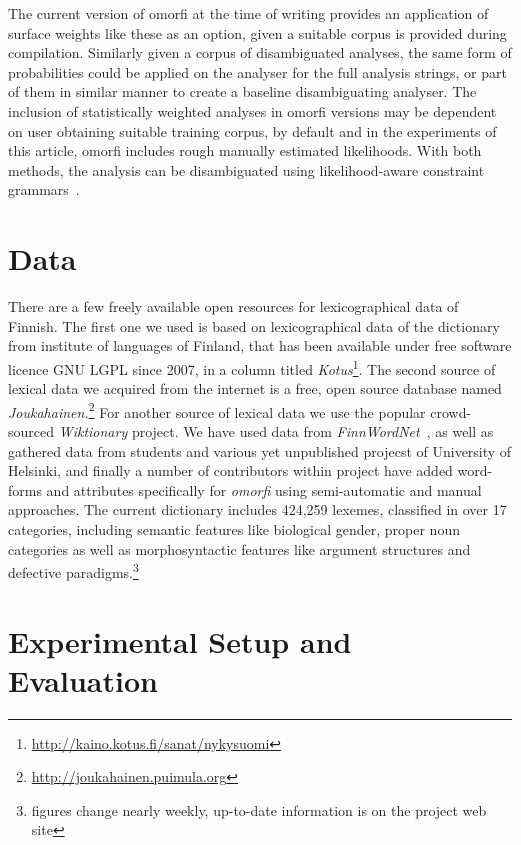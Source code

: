 \documentclass[a4paper,12pt]{article}
\begin{document}
The current version of omorfi at the time of writing provides an application
of surface weights like these as an option, given a suitable corpus is
provided during compilation. Similarly given a corpus of disambiguated
analyses, the same form of probabilities could be applied on the analyser
for the full analysis strings, or part of them in similar manner to create a
baseline disambiguating analyser. The inclusion of statistically weighted
analyses in omorfi versions may be dependent on user obtaining suitable
training corpus, by default and in the experiments of this article, omorfi
includes rough manually estimated likelihoods. With both methods, the
analysis can be disambiguated using likelihood-aware constraint
grammars~\cite{pirinen2015using}.

\section{Data}
\label{sec:data}

There are a few freely available open resources for lexicographical data of
Finnish. The first one we used is based on lexicographical data of the
dictionary from institute of languages of Finland, that has been available
under free software licence GNU LGPL since 2007, in a column titled
\textit{Kotus}\footnote{\url{http://kaino.kotus.fi/sanat/nykysuomi}}.  The
second source of lexical data we acquired from the internet is a free, open
source database named
\textit{Joukahainen.}\footnote{\url{http://joukahainen.puimula.org}} For
another source of lexical data we use the popular crowd-sourced
\textit{Wiktionary} project.  We have used data from
\textit{FinnWordNet}~\citep{linden2010finnwordnet}, as well as gathered data
from students and various yet unpublished projecst of University of Helsinki,
and finally a number of contributors within project have added word-forms and
attributes specifically for \textit{omorfi} using semi-automatic and manual
approaches. The current dictionary includes 424,259 lexemes, classified in over
17 categories, including semantic features like biological gender, proper noun
categories as well as morphosyntactic features like argument structures and
defective paradigms.\footnote{figures change nearly weekly, up-to-date
information is on the project web site}



\section{Experimental Setup and Evaluation}
\label{sec:evaluation}
\end{document}
